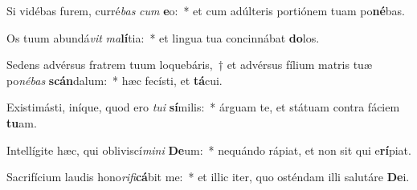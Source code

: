 \item Si vidébas furem, curré\textit{bas} \textit{cum} \textbf{e}o:~* et cum adúlteris portiónem tuam po\textbf{né}bas.
\item Os tuum abundá\textit{vit} \textit{ma}\textbf{lí}tia:~* et lingua tua concinnábat \textbf{do}los.
\item Sedens advérsus fratrem tuum loquebáris,~† et advérsus fílium matris tuæ po\textit{né}\textit{bas} \textbf{scán}dalum:~* hæc fecísti, et \textbf{tá}cui.
\item Existimásti, iníque, quod ero \textit{tu}\textit{i} \textbf{sí}milis:~* árguam te, et státuam contra fáciem \textbf{tu}am.
\item Intellígite hæc, qui obliviscí\textit{mi}\textit{ni} \textbf{De}um:~* nequándo rápiat, et non sit qui e\textbf{rí}piat.
\item Sacrifícium laudis hono\textit{ri}\textit{fi}\textbf{cá}bit me:~* et illic iter, quo osténdam illi salutáre \textbf{De}i.
